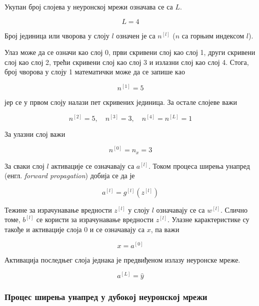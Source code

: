 \documentclass[master]{finthesis}
\begin{document}
Укупан број слојева у неуронској мрежи означава се са $L$.

\begin{equation}
L = 4
\end{equation}

Број јединица или чворова у слоју $l$ означен је са $n^{[l]}$ ($n$ са горњим индексом $l$). 

Улаз може да се означи као слој 0, први скривени слој као слој 1, други скривени слој као слој 2, трећи скривени слој као слој 3 и излазни слој као слој 4. Стога, број чворова у слоју 1 математички може да се запише као

\begin{equation}
n^{[1]} = 5
\end{equation}

јер се у првом слоју налази пет скривених јединица. 
За остале слојеве важи 

\begin{equation}
n^{[2]} = 5,\quad n^{[3]} = 3, \quad n^{[4]} = n^{[L]} = 1
\end{equation}

За улазни слој важи

\begin{equation}
n^{[0]} = n_x = 3
\end{equation}


За сваки слој $l$ активације се означавају са $a^{[l]}$. Током процеса ширења унапред (енгл. \textit{forward propagation}) добија се да је

\begin{equation}
a^{[l]} = g^{[l]}(z^{[l]})
\end{equation}

Тежине за израчунавање вредности $z^{[l]}$ у слоју $l$ означавају се са $w^{[l]}$. Слично томе, $b^{[l]}$ се користи за израчунавање вредности $z^{[l]}$. Улазне карактеристике су такође и активације слоја 0 и се означавају са $x$, па важи

\begin{equation}
x = a^{[0]}
\label{eq:equality}
\end{equation}

Активација последњег слоја једнака је предвиђеном излазу неуронске мреже.

\begin{equation}
a^{[L]} = \hat{y}
\end{equation}

\subsubsection{Процес ширења унапред у дубокој неуронској мрежи}
\end{document}
